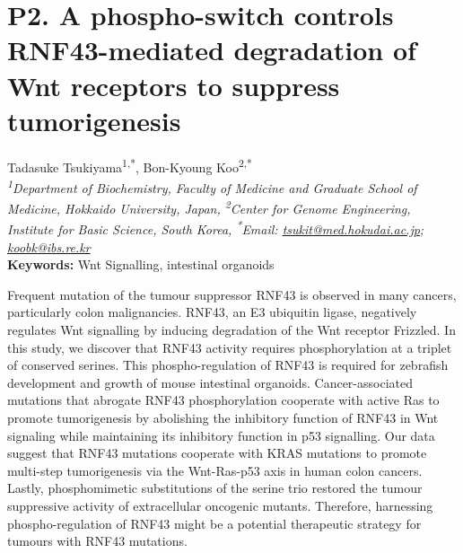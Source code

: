 
\section*{P2. A phospho-switch controls RNF43-mediated degradation of Wnt receptors to suppress tumorigenesis}

\begin{center}
Tadasuke Tsukiyama\textsuperscript{1,*}, Bon-Kyoung Koo\href{https://orcid.org/0000-0002-4134-8033}{\textcolor{orcidlogocol}{\aiOrcid}}\textsuperscript{2,*} \\
\vspace{0.2cm}
\textit{\textsuperscript{1}Department of Biochemistry, Faculty of Medicine and Graduate School of Medicine, Hokkaido University, Japan, \textsuperscript{2}Center for Genome Engineering, Institute for Basic Science, South Korea, \textsuperscript{*}Email: \href{mailto:tsukit@med.hokudai.ac.jp}{tsukit@med.hokudai.ac.jp}; \href{mailto:koobk@ibs.re.kr}{koobk@ibs.re.kr}} \\
\vspace{0.2cm}
\textbf{Keywords:} Wnt Signalling, intestinal organoids
\end{center}

\noindent
Frequent mutation of the tumour suppressor RNF43 is observed in many cancers, particularly colon malignancies. RNF43, an E3 ubiquitin ligase, negatively regulates Wnt signalling by inducing degradation of the Wnt receptor Frizzled. In this study, we discover that RNF43 activity requires phosphorylation at a triplet of conserved serines. This phospho-regulation of RNF43 is required for zebrafish development and growth of mouse intestinal organoids. Cancer-associated mutations that abrogate RNF43 phosphorylation cooperate with active Ras to promote tumorigenesis by abolishing the inhibitory function of RNF43 in Wnt signaling while maintaining its inhibitory function in p53 signalling. Our data suggest that RNF43 mutations cooperate with KRAS mutations to promote multi-step tumorigenesis via the Wnt-Ras-p53 axis in human colon cancers. Lastly, phosphomimetic substitutions of the serine trio restored the tumour suppressive activity of extracellular oncogenic mutants. Therefore, harnessing phospho-regulation of RNF43 might be a potential therapeutic strategy for tumours with RNF43 mutations.
\newpage

